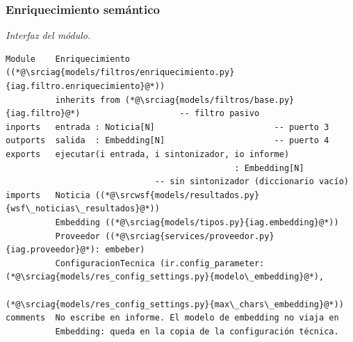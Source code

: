 \documentclass[12pt]{report}
\newcommand{\wsfrepo}{https://github.com/wsf/wsfnoticias}
\newcommand{\wsfref}{aa59c466581c0ce83c16f88f63d6021e9039fbcd}
\newcommand{\srcwsf}[2]{\href{\wsfrepo/blob/\wsfref/#1}{#2}}
\newcommand{\iagrepo}{https://github.com/lbassani12/noticias_iag}
\newcommand{\iagref}{bca7dba0bc76cf5533bd8df1d9a27493d498942d}
\newcommand{\srciag}[2]{\href{\iagrepo/blob/\iagref/#1}{#2}}
\begin{document}
\subsubsection{Enriquecimiento semántico}
\label{sec:impl-mat-enriquecimiento}

\noindent\begin{minipage}{\linewidth}
  \textit{Interfaz del módulo.}
  \begin{lstlisting}[style=implbloque]
Module    Enriquecimiento ((*@\srciag{models/filtros/enriquecimiento.py}{iag.filtro.enriquecimiento}@*))
          inherits from (*@\srciag{models/filtros/base.py}{iag.filtro}@*)                    -- filtro pasivo
inports   entrada : Noticia[N]                        -- puerto 3
outports  salida  : Embedding[N]                      -- puerto 4
exports   ejecutar(i entrada, i sintonizador, io informe)
                                              : Embedding[N]
                              -- sin sintonizador (diccionario vacío)
imports   Noticia ((*@\srcwsf{models/resultados.py}{wsf\_noticias\_resultados}@*))
          Embedding ((*@\srciag{models/tipos.py}{iag.embedding}@*))
          Proveedor ((*@\srciag{services/proveedor.py}{iag.proveedor}@*): embeber)
          ConfiguracionTecnica (ir.config_parameter: (*@\srciag{models/res_config_settings.py}{modelo\_embedding}@*),
                                (*@\srciag{models/res_config_settings.py}{max\_chars\_embedding}@*))
comments  No escribe en informe. El modelo de embedding no viaja en
          Embedding: queda en la copia de la configuración técnica.
\end{lstlisting}
\end{minipage}
\end{document}

